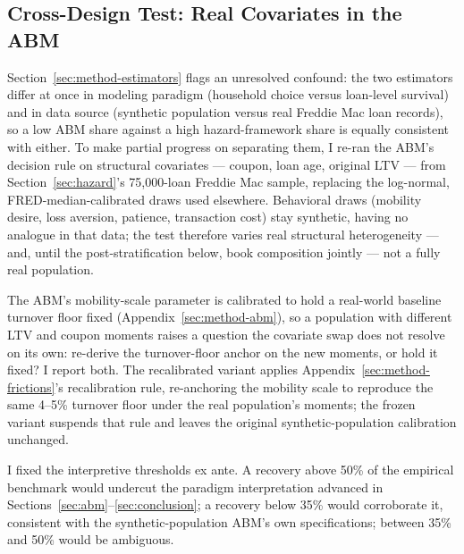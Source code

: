 \subsection{Cross-Design Test: Real Covariates in the ABM}\label{sec:robustness-crossdesign}

Section~\ref{sec:method-estimators} flags an unresolved confound: the two estimators differ at once in modeling paradigm (household choice versus loan-level survival) and in data source (synthetic population versus real Freddie Mac loan records), so a low ABM share against a high hazard-framework share is equally consistent with either. To make partial progress on separating them, I re-ran the ABM's decision rule on structural covariates --- coupon, loan age, original LTV --- from Section~\ref{sec:hazard}'s 75,000-loan Freddie Mac sample, replacing the log-normal, FRED-median-calibrated draws used elsewhere. Behavioral draws (mobility desire, loss aversion, patience, transaction cost) stay synthetic, having no analogue in that data; the test therefore varies real structural heterogeneity --- and, until the post-stratification below, book composition jointly --- not a fully real population.

The ABM's mobility-scale parameter is calibrated to hold a real-world baseline turnover floor fixed (Appendix~\ref{sec:method-abm}), so a population with different LTV and coupon moments raises a question the covariate swap does not resolve on its own: re-derive the turnover-floor anchor on the new moments, or hold it fixed? I report both. The recalibrated variant applies Appendix~\ref{sec:method-frictions}'s recalibration rule, re-anchoring the mobility scale to reproduce the same 4--5\% turnover floor under the real population's moments; the frozen variant suspends that rule and leaves the original synthetic-population calibration unchanged.

I fixed the interpretive thresholds ex ante. A recovery above 50\% of the empirical benchmark would undercut the paradigm interpretation advanced in Sections~\ref{sec:abm}--\ref{sec:conclusion}; a recovery below 35\% would corroborate it, consistent with the synthetic-population ABM's own specifications; between 35\% and 50\% would be ambiguous.

